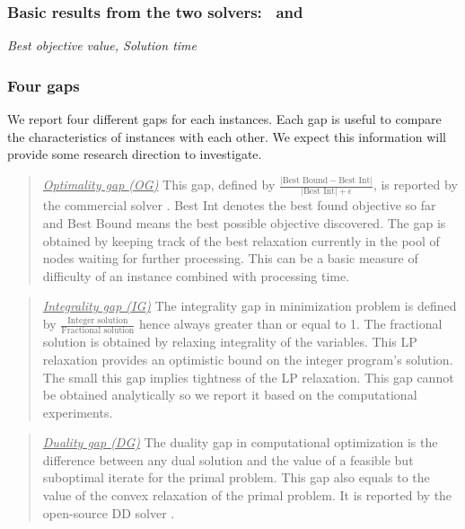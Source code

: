 \subsubsection {Basic results from the two solvers: \cplex\ and \dsp}
\noindent\textit{Best objective value, Solution time}

\subsubsection{Four gaps}
We report four different gaps for each instances. Each gap is useful to compare the characteristics of instances with each other. We expect this information will provide some research direction to investigate. 

\begin{quote}
\noindent\underline{\textit{Optimality gap (OG)}} This gap, defined by $\frac{|\textrm{Best Bound}-\textrm{Best Int}|}{|\textrm{Best Int}|+\epsilon}$, is reported by the commercial solver \cplex. Best Int denotes the best found objective so far and Best Bound means the best possible objective discovered. The gap is obtained by keeping track of the best relaxation currently in the pool of nodes waiting for further processing. This can be a basic measure of difficulty of an instance combined with processing time.
\end{quote}

\begin{quote}
\noindent\underline{\textit{Integrality gap (IG)}} The integrality gap in minimization problem is defined by $\frac{\textrm{Integer solution}}{\textrm{Fractional solution}}$ hence always greater than or equal to 1. The fractional solution is obtained by relaxing integrality of the variables. This LP relaxation provides an optimistic bound on the integer program's solution. The small this gap implies tightness of the LP relaxation. This gap cannot be obtained analytically so we report it based on the computational experiments.%
\end{quote}

\begin{quote}
\noindent\underline{\textit{Duality gap (DG)}} The duality gap in computational optimization is the difference between any dual solution and the value of a feasible but suboptimal iterate for the primal problem. This gap also equals to the value of the convex relaxation of the primal problem. It is reported by the open-source DD solver \dsp.
\end{quote}

